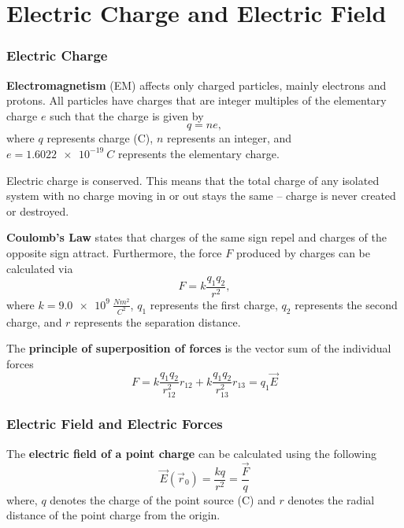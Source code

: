 
\chapter{Electric Charge and Electric Field}

\subsection{Electric Charge}
\textbf{Electromagnetism} (EM) affects only charged particles, mainly electrons and protons. All particles have charges that are integer multiples of the elementary charge $e$ such that the charge is given by
\begin{equation}
q = ne,
\end{equation}
where $q$ represents charge (C), $n$ represents an integer, and $e = \SI{1.6022e-19}{C}$ represents the elementary charge.

Electric charge is conserved. This means that the total charge of any isolated system with no charge moving in or out stays the same -- charge is never created or destroyed. 

\textbf{Coulomb's Law} states that charges of the same sign repel and charges of the opposite sign attract. Furthermore, the force $F$ produced by charges can be calculated via
\begin{equation}
F = k\frac{q_1q_2}{r^2},
\end{equation}
where $k = \SI{9.0e9}{\frac{N m^2}{C^2}}$, $q_1$ represents the first charge, $q_2$ represents the second charge, and $r$ represents the separation distance.

The \textbf{principle of superposition of forces} is the vector sum of the individual forces
\begin{equation}
F = k\frac{q_1q_2}{r_{12}^2}r_{12} + k\frac{q_1q_2}{r_{13}^2}r_{13} = q_1 \vec{E}
\end{equation}
\newpage

\subsection{Electric Field and Electric Forces}

The \textbf{electric field of a point charge} can be calculated using the following
\begin{equation}
\vec E (\vec r_0)= \frac{kq}{r^2} = \frac{\vec{F}}{q}
\end{equation}
where, $q$ denotes the charge of the point source (C) and $r$ denotes the radial distance of the point charge from the origin.

